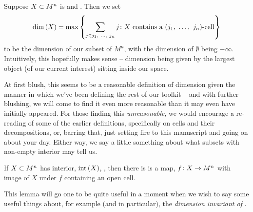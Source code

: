 \begin{definition}[Dimension]
  Suppose $\XsubsetMn$ is  and \inhb. Then we set 
  \begin{align*}
    \dim{X} = \max{ \left\{ \sum_{j \in \vonevm{j}{n}} j \colon X \textrm{ contains a } \vmcell{j}{n} \right\} }
  \end{align*}
  to be the dimension of our subset of $M^n$, with the dimension of $\emptyset$ being $- \infty$. Intuitively, this hopefully makes sense -- dimension being given by the largest object (of our current interest) sitting inside our space.
  \label{defn:defn_dim}
\end{definition}

At first blush, this seems to be a reasonable definition of dimension given the manner in which we've been defining the rest of our toolkit -- and with further blushing, we will come to find it even more reasonable than it may even have initially appeared. For those finding this \emph{unreasonable}, we would encourage a re-reading of some of the earlier definitions, specifically on cells and their decompositions, or, barring that, just setting fire to this manuscript and going on about your day. Either way, we say a little something about what subsets with non-empty interior may tell us.

\begin{lemma}
  \label{lemma:interior-open-cell}
  If $\XsubsetMn[n]$ has interior, $\inter{X}$, \inhb, then there is is a  \inj map, $\funcdom{f}{X}{M^n}$ with image of $X$ under $f$ containing an open cell.
\end{lemma}
This lemma will go one to be quite useful in a moment when we wish to say some useful things about, for example (and in particular), the \emph{dimension invariant of  \bijtions }.


